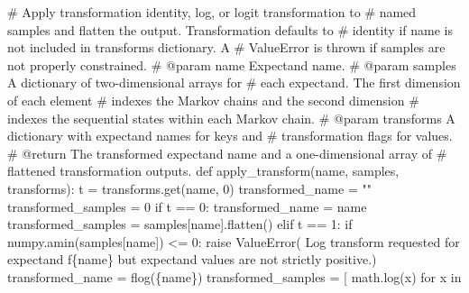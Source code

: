 \documentclass[
  letterpaper,
  DIV=11,
  numbers=noendperiod]{scrartcl}
\newenvironment{Shaded}{\begin{snugshade}}{\end{snugshade}}
\newcommand{\CommentTok}[1]{\textcolor[rgb]{0.37,0.37,0.37}{#1}}
\newcommand{\ControlFlowTok}[1]{\textcolor[rgb]{0.00,0.23,0.31}{#1}}
\newcommand{\DecValTok}[1]{\textcolor[rgb]{0.68,0.00,0.00}{#1}}
\newcommand{\KeywordTok}[1]{\textcolor[rgb]{0.00,0.23,0.31}{#1}}
\newcommand{\NormalTok}[1]{\textcolor[rgb]{0.00,0.23,0.31}{#1}}
\newcommand{\OperatorTok}[1]{\textcolor[rgb]{0.37,0.37,0.37}{#1}}
\newcommand{\PreprocessorTok}[1]{\textcolor[rgb]{0.68,0.00,0.00}{#1}}
\newcommand{\SpecialCharTok}[1]{\textcolor[rgb]{0.37,0.37,0.37}{#1}}
\newcommand{\SpecialStringTok}[1]{\textcolor[rgb]{0.13,0.47,0.30}{#1}}
\newcommand{\StringTok}[1]{\textcolor[rgb]{0.13,0.47,0.30}{#1}}
\begin{document}
\begin{Shaded}
\begin{Highlighting}[]
\CommentTok{\# Apply transformation identity, log, or logit transformation to}
\CommentTok{\# named samples and flatten the output.  Transformation defaults to}
\CommentTok{\# identity if name is not included in \textasciigrave{}transforms\textasciigrave{} dictionary.  A}
\CommentTok{\# ValueError is thrown if samples are not properly constrained.}
\CommentTok{\# @param name Expectand name.}
\CommentTok{\# @param samples A dictionary of two{-}dimensional arrays for}
\CommentTok{\#                each expectand.  The first dimension of each element}
\CommentTok{\#                indexes the Markov chains and the second dimension}
\CommentTok{\#                indexes the sequential states within each Markov chain.}
\CommentTok{\# @param transforms A dictionary with expectand names for keys and}
\CommentTok{\#                   transformation flags for values.}
\CommentTok{\# @return The transformed expectand name and a one{-}dimensional array of}
\CommentTok{\#         flattened transformation outputs.}
\KeywordTok{def}\NormalTok{ apply\_transform(name, samples, transforms):}
\NormalTok{  t }\OperatorTok{=}\NormalTok{ transforms.get(name, }\DecValTok{0}\NormalTok{)}
\NormalTok{  transformed\_name }\OperatorTok{=} \StringTok{""}
\NormalTok{  transformed\_samples }\OperatorTok{=} \DecValTok{0}
  \ControlFlowTok{if}\NormalTok{ t }\OperatorTok{==} \DecValTok{0}\NormalTok{:}
\NormalTok{    transformed\_name }\OperatorTok{=}\NormalTok{ name}
\NormalTok{    transformed\_samples }\OperatorTok{=}\NormalTok{ samples[name].flatten()}
  \ControlFlowTok{elif}\NormalTok{ t }\OperatorTok{==} \DecValTok{1}\NormalTok{:}
    \ControlFlowTok{if}\NormalTok{ numpy.amin(samples[name]) }\OperatorTok{\textless{}=} \DecValTok{0}\NormalTok{:}
      \ControlFlowTok{raise} \PreprocessorTok{ValueError}\NormalTok{( }\StringTok{\textquotesingle{}Log transform requested for expectand \textquotesingle{}}
                       \SpecialStringTok{f\textquotesingle{}}\SpecialCharTok{\{}\NormalTok{name}\SpecialCharTok{\}}\SpecialStringTok{ but expectand values are not strictly \textquotesingle{}} 
                        \StringTok{\textquotesingle{}positive.\textquotesingle{}}\NormalTok{)}
\NormalTok{    transformed\_name }\OperatorTok{=} \SpecialStringTok{f\textquotesingle{}log(}\SpecialCharTok{\{}\NormalTok{name}\SpecialCharTok{\}}\SpecialStringTok{)\textquotesingle{}}
\NormalTok{    transformed\_samples }\OperatorTok{=}\NormalTok{ [ math.log(x) }\ControlFlowTok{for}\NormalTok{ x }\KeywordTok{in} 

\end{Highlighting}
\end{Shaded}
\end{document}
